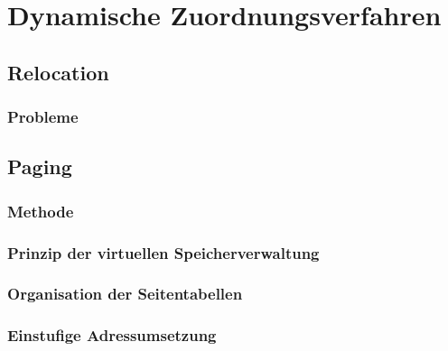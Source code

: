 \section{Dynamische Zuordnungsverfahren}
\subsection{Relocation}
\subsubsection{Probleme}
\subsection{Paging}
\subsubsection{Methode}
\subsubsection{Prinzip der virtuellen Speicherverwaltung}
\subsubsection{Organisation der Seitentabellen}

\subsubsection{Einstufige Adressumsetzung}

